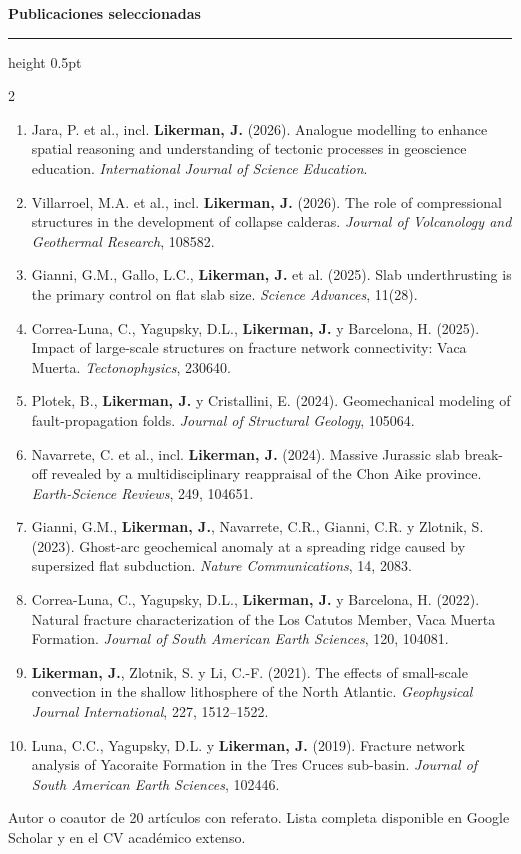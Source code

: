 \documentclass[10pt,a4paper]{../awesome-cv}
\makeatletter
\renewcommand*{\sectionstyle}[1]{{\fontsize{12.2pt}{14pt}\bodyfont\bfseries\color{text}\@sectioncolor #1}}
\renewcommand*{\descriptionstyle}[1]{{\fontsize{8.1pt}{9.8pt}\bodyfontlight\upshape\color{text} #1}}
\renewcommand{\cvsection}[1]{%
  \par\Needspace{3.3\baselineskip}%
  \addvspace{2.3mm}%
  \sectionstyle{#1}\par\nobreak%
  \vspace{0.1mm}%
  {\color{gray}\hrule height 0.5pt}%
  \vspace{0.55mm}%
}
\makeatother
\begin{document}
\cvsection{Publicaciones seleccionadas}
{\fontsize{7.35pt}{8.75pt}\bodyfontlight\color{text}
\begin{multicols}{2}
\raggedcolumns
\begin{enumerate}
\item Jara, P. et al., incl. \textbf{Likerman, J.} (2026). Analogue modelling to enhance spatial reasoning and understanding of tectonic processes in geoscience education. \emph{International Journal of Science Education}.
\item Villarroel, M.A. et al., incl. \textbf{Likerman, J.} (2026). The role of compressional structures in the development of collapse calderas. \emph{Journal of Volcanology and Geothermal Research}, 108582.
\item Gianni, G.M., Gallo, L.C., \textbf{Likerman, J.} et al. (2025). Slab underthrusting is the primary control on flat slab size. \emph{Science Advances}, 11(28).
\item Correa-Luna, C., Yagupsky, D.L., \textbf{Likerman, J.} y Barcelona, H. (2025). Impact of large-scale structures on fracture network connectivity: Vaca Muerta. \emph{Tectonophysics}, 230640.
\item Plotek, B., \textbf{Likerman, J.} y Cristallini, E. (2024). Geomechanical modeling of fault-propagation folds. \emph{Journal of Structural Geology}, 105064.
\item Navarrete, C. et al., incl. \textbf{Likerman, J.} (2024). Massive Jurassic slab break-off revealed by a multidisciplinary reappraisal of the Chon Aike province. \emph{Earth-Science Reviews}, 249, 104651.
\item Gianni, G.M., \textbf{Likerman, J.}, Navarrete, C.R., Gianni, C.R. y Zlotnik, S. (2023). Ghost-arc geochemical anomaly at a spreading ridge caused by supersized flat subduction. \emph{Nature Communications}, 14, 2083.
\item Correa-Luna, C., Yagupsky, D.L., \textbf{Likerman, J.} y Barcelona, H. (2022). Natural fracture characterization of the Los Catutos Member, Vaca Muerta Formation. \emph{Journal of South American Earth Sciences}, 120, 104081.
\item \textbf{Likerman, J.}, Zlotnik, S. y Li, C.-F. (2021). The effects of small-scale convection in the shallow lithosphere of the North Atlantic. \emph{Geophysical Journal International}, 227, 1512--1522.
\item Luna, C.C., Yagupsky, D.L. y \textbf{Likerman, J.} (2019). Fracture network analysis of Yacoraite Formation in the Tres Cruces sub-basin. \emph{Journal of South American Earth Sciences}, 102446.
\end{enumerate}
\end{multicols}
}
\vspace{-1mm}
\descriptionstyle{Autor o coautor de 20 artículos con referato. Lista completa disponible en Google Scholar y en el CV académico extenso.}
\end{document}
